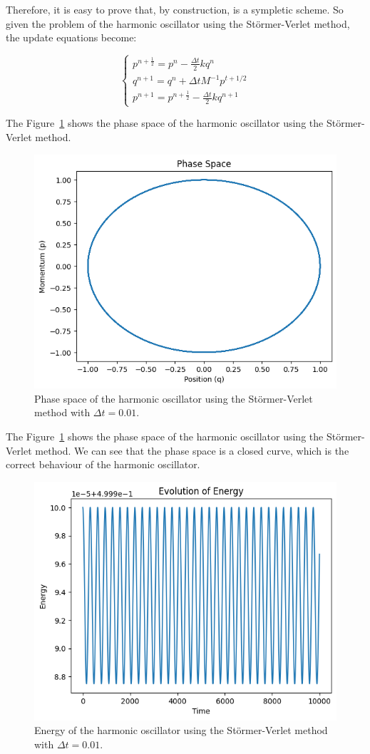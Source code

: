 \documentclass{article}
\begin{document}
Therefore, it is easy to prove that, by construction, is a sympletic scheme. So given the problem of the harmonic oscillator using the Störmer-Verlet method, the update equations become:

\begin{equation}
	\begin{cases}
		p^{n + \frac{1}{2}} = p^n - \frac{\Delta t}{2} kq^n \\
		q^{n+1} = q^{n} + \Delta t M^{-1} p^{t+1/2} \\
		p^{n+1} = p^{n+\frac{1}{2}} - \frac{\Delta t}{2} kq^{n+1}
	\end{cases}
	\label{eq:stormerverletharmonic}
\end{equation}

The Figure~\ref{fig:stormerverletphase} shows the phase space of the harmonic oscillator using the Störmer-Verlet method.

\begin{figure}[H]
	\centering
	\includegraphics[width=0.5\linewidth]{./Figures/Sympletic/verletphase.png}
	\caption{Phase space of the harmonic oscillator using the Störmer-Verlet method with \(\Delta t = 0.01\).}
	\label{fig:stormerverletphase}
\end{figure}

The Figure~\ref{fig:stormerverletphase} shows the phase space of the harmonic oscillator using the Störmer-Verlet method. We can see that the phase space is a closed curve, which is the correct behaviour of the harmonic oscillator.

\begin{figure}[H]
	\centering
	\includegraphics[width=0.5\linewidth]{./Figures/Sympletic/verletenergy.png}
	\caption{Energy of the harmonic oscillator using the Störmer-Verlet method with \(\Delta t = 0.01\).}
	\label{fig:stormerverletenergy}
\end{figure}
\end{document}
